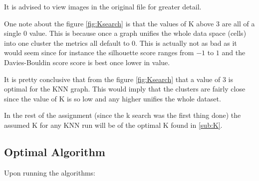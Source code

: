 \documentclass[12pt, a4paper]{article}
\begin{document}
                \begin{multicols}{2}

                It is advised to view images in the original file for greater detail.
                \newline

                One note about the figure \ref{fig:Ksearch} is that the values of K above $3$ are all of a single $0$ value. This is because once a graph unifies the whole data space (cells) into one cluster the metrics all default to $0$. This is actually not as bad as it would seem since for instance the silhouette score ranges from $-1$ to $1$ and the Davies-Bouldin score score is best once lower in value.
                \newline

                It is pretty conclusive that from the figure \ref{fig:Ksearch} that a value of $3$ is optimal for the KNN graph. This would imply that the clusters are fairly close since the value of K is so low and any higher unifies the whole dataset.
                \newline

                In the rest of the assignment (since the k search was the first thing done) the assumed K for any KNN run will be of the optimal K found in \ref{sub:K}.
                \newline


            \subsection{Optimal Algorithm}\label{sub:Optimal Algorithm} %

                Upon running the algorithms:

                \end{multicols}
\end{document}

